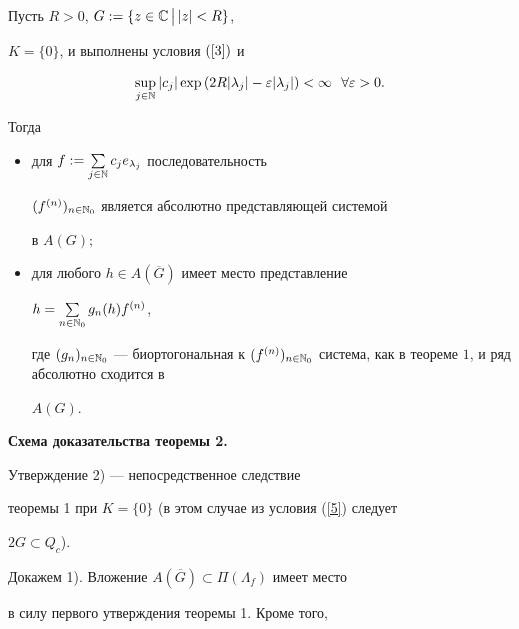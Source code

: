 \begin{thm}


Пусть $R>0$, $G:=\{z\in\Bbb C\,\big|\,|z|<R\}$,


$K=\{0\}$, и выполнены условия $(\ref{3})$ и


\begin{equation}


\label{5}


\sup\limits_{j\in\Bbb N}|c_j|\exp{\left(2R|\lambda_j|-


\varepsilon|\lambda_j|\right)}<\infty\ \ \forall\varepsilon>0.


\end{equation}


Тогда


\begin{itemize}


\item[1)] для $f:=\sum\limits_{j\in\Bbb N}


c_je_{\lambda_j}$ последовательность


$(f^{(n)})_{n\in\Bbb N_0}$ является абсолютно представляющей системой


в $A(G);$


\item[2)] для любого $h\in A(\overline{G})$ имеет место представление


$h=\sum\limits_{n\in\Bbb N_0}g_n(h)f^{(n)}$,


где $(g_n)_{n\in\Bbb N_0}$ --- би\-ортогональная к $(f^{(n)})_


{n\in\Bbb N_0}$ система, как в теореме $1$, и ряд абсолютно сходится в


$A({G})$.


\end{itemize}


\end{thm}





{\bf Схема доказательства теоремы 2.}


Утверждение 2) --- непосредственное следствие


теоремы 1 при $K=\{0\}$ (в этом случае из условия (\ref{5}) следует


$2G\subset Q_c$).





Докажем 1). Вложение $A(\overline{G})\subset\Pi(\Lambda_f)$ имеет место


в силу первого утверждения теоремы 1. Кроме того,


